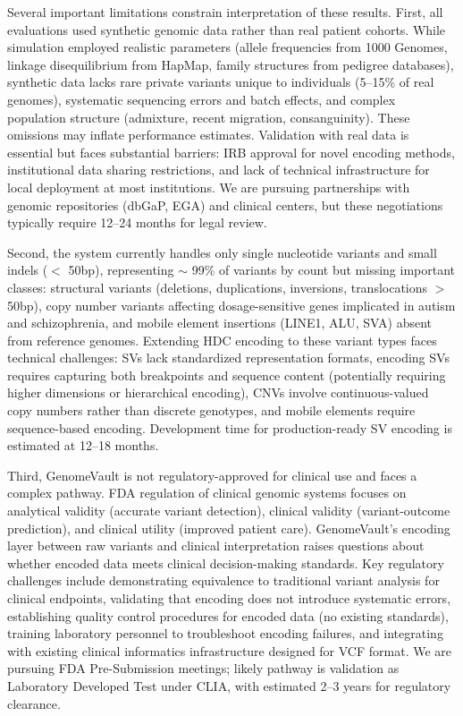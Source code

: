 \documentclass[11pt,letterpaper]{article}
\begin{document}
Several important limitations constrain interpretation of these results. First, all evaluations used synthetic genomic data rather than real patient cohorts. While simulation employed realistic parameters (allele frequencies from 1000 Genomes, linkage disequilibrium from HapMap, family structures from pedigree databases), synthetic data lacks rare private variants unique to individuals (5--15\% of real genomes), systematic sequencing errors and batch effects, and complex population structure (admixture, recent migration, consanguinity). These omissions may inflate performance estimates. Validation with real data is essential but faces substantial barriers: IRB approval for novel encoding methods, institutional data sharing restrictions, and lack of technical infrastructure for local deployment at most institutions. We are pursuing partnerships with genomic repositories (dbGaP, EGA) and clinical centers, but these negotiations typically require 12--24 months for legal review.

Second, the system currently handles only single nucleotide variants and small indels ($<$ 50bp), representing $\sim$ 99\% of variants by count but missing important classes: structural variants (deletions, duplications, inversions, translocations $>$ 50bp), copy number variants affecting dosage-sensitive genes implicated in autism and schizophrenia, and mobile element insertions (LINE1, ALU, SVA) absent from reference genomes. Extending HDC encoding to these variant types faces technical challenges: SVs lack standardized representation formats, encoding SVs requires capturing both breakpoints and sequence content (potentially requiring higher dimensions or hierarchical encoding), CNVs involve continuous-valued copy numbers rather than discrete genotypes, and mobile elements require sequence-based encoding. Development time for production-ready SV encoding is estimated at 12--18 months.

Third, GenomeVault is not regulatory-approved for clinical use and faces a complex pathway. FDA regulation of clinical genomic systems focuses on analytical validity (accurate variant detection), clinical validity (variant-outcome prediction), and clinical utility (improved patient care). GenomeVault's encoding layer between raw variants and clinical interpretation raises questions about whether encoded data meets clinical decision-making standards. Key regulatory challenges include demonstrating equivalence to traditional variant analysis for clinical endpoints, validating that encoding does not introduce systematic errors, establishing quality control procedures for encoded data (no existing standards), training laboratory personnel to troubleshoot encoding failures, and integrating with existing clinical informatics infrastructure designed for VCF format. We are pursuing FDA Pre-Submission meetings; likely pathway is validation as Laboratory Developed Test under CLIA, with estimated 2--3 years for regulatory clearance.
\end{document}
